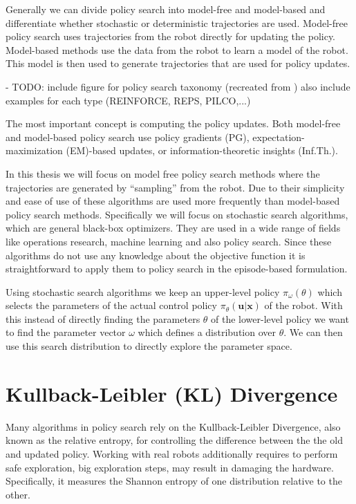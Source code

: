Generally we can divide policy search into model-free and model-based and
differentiate whether stochastic or deterministic trajectories are used.
Model-free policy search uses trajectories from the robot directly
for updating the policy. Model-based methods use the data
from the robot to learn a model of the robot. This model is then used
to generate trajectories that are used for policy updates.

- TODO: include figure for policy search taxonomy
  (recreated from \citet{deisenroth2013survey})
  also include examples for each type (REINFORCE, REPS, PILCO,...)

The most important concept is computing the policy updates.
Both model-free and model-based policy search use policy gradients (PG),
expectation-maximization (EM)-based updates, or
information-theoretic insights (Inf.Th.).

In this thesis we will focus on model free policy search methods
where the trajectories are generated by ``sampling'' from
the robot.
Due to their simplicity and ease of use of these algorithms
are used more frequently than model-based policy search methods.
Specifically we will focus on stochastic
search algorithms, which are general black-box optimizers.
They are used in a wide range of fields like operations research,
machine learning and also policy search.
Since these algorithms do not use any knowledge about the
objective function it is straightforward to
apply them to policy search in the episode-based formulation.

Using stochastic search algorithms we keep an upper-level policy
$\pi_{\omega}(\theta)$ which selects the parameters of the
actual control policy $\pi_{\theta}(\mathbf{u} | \mathbf{x})$ of the robot.
With this instead of directly finding the parameters $\theta$ of the
lower-level policy we want to find the parameter vector $\omega$ which
defines a distribution over $\theta$. We can then use this
search distribution to directly explore the parameter space.


\section{Kullback-Leibler (KL) Divergence}
Many algorithms in policy search rely on the Kullback-Leibler Divergence, also
known as the relative entropy, for controlling
the difference between the the old and updated policy.
Working with real robots additionally requires to perform safe exploration, big
exploration steps, may result in damaging the hardware.
Specifically, it measures the Shannon entropy of one distribution relative to the
other.

